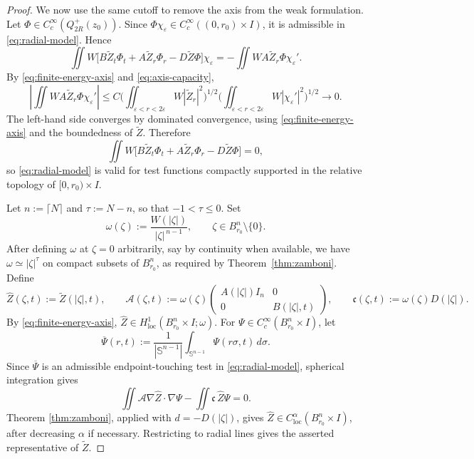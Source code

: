 \documentclass[11pt]{amsart}
\newcommand{\dd}{\,d}
\newcommand{\loc}{\mathrm{loc}}
\begin{document}
\begin{proof}
We now use the same cutoff to remove the axis from the weak formulation.
Let \(\Phi\in C_c^\infty(Q_{2R}^+(z_0))\). Since
\(\Phi\chi_\varepsilon\in C_c^\infty((0,r_0)\times I)\), it is admissible in
\eqref{eq:radial-model}. Hence
\[
        \iint W\bigl[B\widetilde Z_t\Phi_t+A\widetilde Z_r\Phi_r-D\widetilde Z\Phi\bigr]\chi_\varepsilon
        =
        -\iint WA\widetilde Z_r\Phi\chi_\varepsilon' .
\]
By \eqref{eq:finite-energy-axis} and \eqref{eq:axis-capacity},
\[
        \left|\iint WA\widetilde Z_r\Phi\chi_\varepsilon'\right|
        \le C
        \biggl(\iint_{\varepsilon<r<2\varepsilon}W|\widetilde Z_r|^2\biggr)^{1/2}
        \biggl(\iint_{\varepsilon<r<2\varepsilon}
        W|\chi_\varepsilon'|^2\biggr)^{1/2}
        \to0 .
\]
The left-hand side converges by dominated convergence, using
\eqref{eq:finite-energy-axis} and the boundedness of \(\widetilde Z\). Therefore
\[
        \iint W\bigl[B\widetilde Z_t\Phi_t+A\widetilde Z_r\Phi_r-D\widetilde Z\Phi\bigr]=0,
\]
so \eqref{eq:radial-model} is valid for test functions compactly supported in
the relative topology of \([0,r_0)\times I\).

Let \(n:=\lceil N\rceil\) and \(\tau:=N-n\), so that \(-1<\tau\le0\). Set
\[
        \omega(\zeta):=\frac{W(|\zeta|)}{|\zeta|^{\,n-1}},
        \qquad \zeta\in B_{r_0}^n\setminus\{0\} .
\]
After defining \(\omega\) at \(\zeta=0\) arbitrarily, say by continuity when
available, we have \(\omega\simeq|\zeta|^\tau\) on compact subsets of
\(B_{r_0}^n\), as required by Theorem~\ref{thm:zamboni}.
Define
\[
        \widehat Z(\zeta,t):=\widetilde Z(|\zeta|,t),\qquad
        \mathcal A(\zeta,t):=\omega(\zeta)
        \begin{pmatrix}
        A(|\zeta|)I_n&0\\
        0&B(|\zeta|,t)
        \end{pmatrix},
        \qquad
        \mathfrak c(\zeta,t):=\omega(\zeta)D(|\zeta|).
\]
By \eqref{eq:finite-energy-axis},
\(\widehat Z\in H^1_{\loc}(B_{r_0}^n\times I;\omega)\). For
\(\Psi\in C_c^\infty(B_{r_0}^n\times I)\), let
\[
        \overline\Psi(r,t):=\frac1{|\mathbb S^{n-1}|}
        \int_{\mathbb S^{n-1}}\Psi(r\sigma,t)\dd\sigma .
\]
Since \(\overline\Psi\) is an admissible endpoint-touching test in
\eqref{eq:radial-model}, spherical integration gives
\[
        \iint \mathcal A\nabla\widehat Z\cdot\nabla\Psi
        -\iint \mathfrak c\,\widehat Z\Psi=0 .
\]
Theorem \ref{thm:zamboni}, applied with \(d=-D(|\zeta|)\), gives
\(\widehat Z\in C^\alpha_{\loc}(B_{r_0}^n\times I)\), after decreasing
\(\alpha\) if necessary. Restricting to radial lines gives the asserted
representative of \(\widetilde Z\).
\end{proof}
\end{document}
